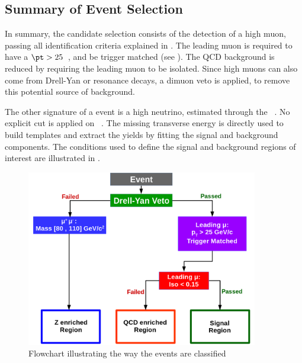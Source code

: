 \subsection{Summary of Event Selection} \label{sec:WBoson_Selection_WSelection}

In summary, the \W candidate selection consists of the detection of a high \pt muon, passing all identification criteria explained in . The leading muon is required to have a $\pt > 25$~\GeVc, and be trigger matched (see ). The QCD background is reduced by requiring the leading muon to be isolated. Since high \pt muons can also come from Drell-Yan or resonance decays, a dimuon veto is applied, to remove this potential source of background.

The other signature of a \W event is a high \pt neutrino, estimated through the \ETslash\ . No explicit cut is applied on \ETslash\ . The missing transverse energy is directly used to build templates and extract the yields by fitting the signal and background components. The conditions used to define the signal and background regions of interest are illustrated in .

\begin{figure}[htb]
 \begin{center}
   \includegraphics[width=0.9\textwidth]{Figures/WBoson/Analysis/EventSelection/FlowChar.png}
   \caption{Flowchart illustrating the way the events are classified}
   \label{fig:EventSelectionDiagram}
 \end{center}
\end{figure}


\clearpage

